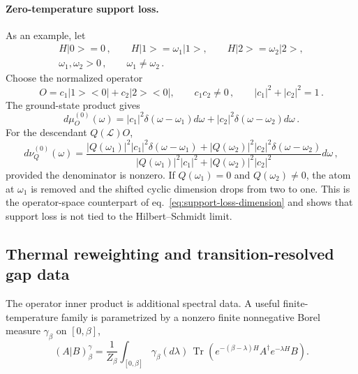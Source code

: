 \documentclass[a4paper,11pt]{article}
\def\ket#1{|#1>}%
\def\bra#1{<#1|}%
\def\dd{d}%
\def\ee{e}%
\theoremstyle{definition}
\theoremstyle{remark}
\newcommand{\ket}[1]{|#1\rangle}
\newcommand{\bra}[1]{\langle #1|}
\newcommand{\dd}{\mathrm d}
\newcommand{\ee}{\mathrm e}
\begin{document}
\paragraph{Zero-temperature support loss.}
As an example, let
\begin{equation}
\begin{gathered}
   H\ket0=0\,,
   \qquad
   H\ket1=\omega_1\ket1,
   \qquad
   H\ket2=\omega_2\ket2,\\
   \omega_1,\omega_2>0\,,
   \qquad
   \omega_1\ne\omega_2\,.
\end{gathered}
   \label{eq:three-level-zero-temp-spectrum-app}
\end{equation}
Choose the normalized operator
\begin{equation}
   O=c_1\ket1\bra0+c_2\ket2\bra0,
   \qquad
   c_1c_2\ne0\,,
   \qquad
   |c_1|^2+|c_2|^2=1\,.
   \label{eq:three-level-zero-temp-operator-app}
\end{equation}
The ground-state product gives
\begin{equation}
   \dd\mu_O^{(0)}(\omega)
   =|c_1|^2\delta(\omega-\omega_1)\dd\omega
    +|c_2|^2\delta(\omega-\omega_2)\dd\omega\,.
   \label{eq:three-level-zero-temp-measure-app}
\end{equation}
For the descendant $Q(\mathcal L)O$,
\begin{equation}
   \dd\nu_Q^{(0)}(\omega)
   =
   \frac{
      |Q(\omega_1)|^2|c_1|^2\delta(\omega-\omega_1)
      +|Q(\omega_2)|^2|c_2|^2\delta(\omega-\omega_2)}
      {|Q(\omega_1)|^2|c_1|^2+|Q(\omega_2)|^2|c_2|^2}\dd\omega\,,
   \label{eq:three-level-zero-temp-shifted-measure-app}
\end{equation}
provided the denominator is nonzero.  If $Q(\omega_1)=0$ and
$Q(\omega_2)\ne0$, the atom at $\omega_1$ is removed and the shifted cyclic dimension drops from
two to one.  This is the operator-space counterpart of eq.~\eqref{eq:support-loss-dimension} and
shows that support loss is not tied to the Hilbert--Schmidt limit.

\subsection{Thermal reweighting and transition-resolved gap data}
\label{app:operator-thermal}

The operator inner product is additional spectral data.  A useful
finite-temperature family is parametrized by a nonzero finite
nonnegative Borel measure $\gamma_\beta$ on $[0,\beta]$,
\begin{equation}
   (A|B)^\gamma_\beta
   =\frac{1}{Z_\beta}
      \int_{[0,\beta]}\gamma_\beta(\dd\lambda)\,
      \operatorname{Tr}\!\left(
         \ee^{-(\beta-\lambda)H}A^\dagger
         \ee^{-\lambda H}B
      \right).
   \label{eq:thermal-inner-product-g-app}
\end{equation}
\end{document}

